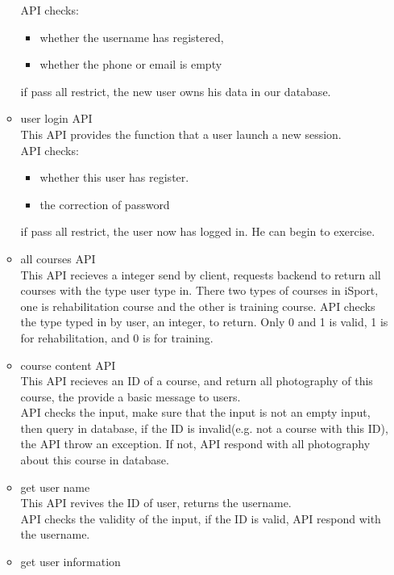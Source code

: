 \documentclass[16pt]{scrreprt}
\begin{document}
\begin{itemize}
\begin{itemize}
                API checks:
                \begin{itemize}
                    \item whether the username has registered, 
                    \item whether the phone or email is empty
                \end{itemize}
                if pass all restrict, the new user owns his data in our database.
            \item user login API\\
                This API provides the function that a user launch a new session.\\
                API checks:
                \begin{itemize}
                    \item whether this user has register.
                    \item the correction of password
                \end{itemize}
                if pass all restrict, the user now has logged in. He can begin to exercise.
            \item all courses API\\
                This API recieves a integer send by client, requests backend to return all courses with the type user type in. There two types of courses in iSport, one is rehabilitation course and the other is training course.
                API checks the type typed in by user, an integer, to return. Only 0 and 1 is valid, 1 is for rehabilitation, and 0 is for training.
            \item course content API\\ 
                This API recieves an ID of a course, and return all photography of this course, the provide a basic message to users.\\
                API checks the input, make sure that the input is not an empty input, then query in database, if the ID is invalid(e.g. not a course with this ID), the API throw an exception. If not, API respond with all photography about this course in database.
            \item get user name\\
                This API revives the ID of user, returns the username.\\
                API checks the validity of the input, if the ID is valid, API respond with the username.
            \item get user information\\

\end{itemize}
\end{itemize}
\end{document}
